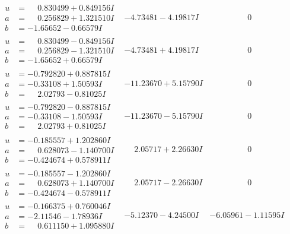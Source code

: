 \documentclass[1p]{elsarticle_modified}
\theoremstyle{definition}
\begin{document}
$$\begin{array}{c|c|c}
\begin{aligned}
u &= \phantom{-}0.830499 + 0.849156 I \\
a &= \phantom{-}0.256829 + 1.321510 I \\
b &= -1.65652 - 0.66579 I\end{aligned}
 & -4.73481 - 4.19817 I & \phantom{-0.000000 } 0 \\ \hline\begin{aligned}
u &= \phantom{-}0.830499 - 0.849156 I \\
a &= \phantom{-}0.256829 - 1.321510 I \\
b &= -1.65652 + 0.66579 I\end{aligned}
 & -4.73481 + 4.19817 I & \phantom{-0.000000 } 0 \\ \hline\begin{aligned}
u &= -0.792820 + 0.887815 I \\
a &= -0.33108 + 1.50593 I \\
b &= \phantom{-}2.02793 - 0.81025 I\end{aligned}
 & -11.23670 + 5.15790 I & \phantom{-0.000000 } 0 \\ \hline\begin{aligned}
u &= -0.792820 - 0.887815 I \\
a &= -0.33108 - 1.50593 I \\
b &= \phantom{-}2.02793 + 0.81025 I\end{aligned}
 & -11.23670 - 5.15790 I & \phantom{-0.000000 } 0 \\ \hline\begin{aligned}
u &= -0.185557 + 1.202860 I \\
a &= \phantom{-}0.628073 - 1.140700 I \\
b &= -0.424674 + 0.578911 I\end{aligned}
 & \phantom{-}2.05717 + 2.26630 I & \phantom{-0.000000 } 0 \\ \hline\begin{aligned}
u &= -0.185557 - 1.202860 I \\
a &= \phantom{-}0.628073 + 1.140700 I \\
b &= -0.424674 - 0.578911 I\end{aligned}
 & \phantom{-}2.05717 - 2.26630 I & \phantom{-0.000000 } 0 \\ \hline\begin{aligned}
u &= -0.166375 + 0.760046 I \\
a &= -2.11546 - 1.78936 I \\
b &= \phantom{-}0.611150 + 1.095880 I\end{aligned}
 & -5.12370 - 4.24500 I & -6.05961 - 1.11595 I \\ \hline\begin{aligned}

\end{aligned}
\end{array}$$
\end{document}
